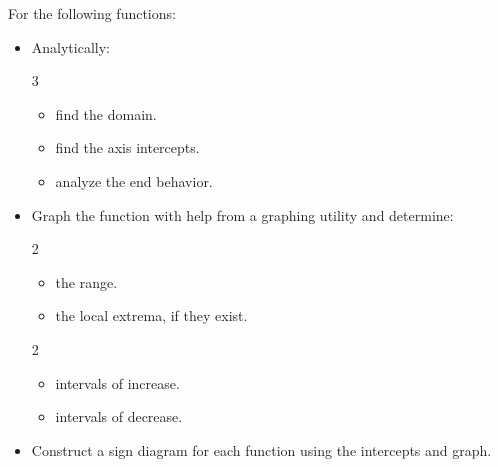 \documentclass{ximera}
\begin{document}
\begin{example}  For the following functions:

\begin{itemize}

\item Analytically:

\begin{multicols}{3}

\begin{itemize}

\item find the domain.

\item find the axis intercepts.

\item analyze the end behavior.

\end{itemize}

\end{multicols}


\item Graph the function with help from a graphing utility and determine:

\begin{multicols}{2}

\begin{itemize}

\item  the range.

\item the local extrema, if they exist.

\end{itemize}

\end{multicols}

\begin{multicols}{2}

\begin{itemize}

\item intervals of increase.

\item intervals of decrease.

\end{itemize}

\end{multicols}

\item Construct a sign diagram for each function using the intercepts and graph.
\end{itemize}


\end{example}
\end{document}
